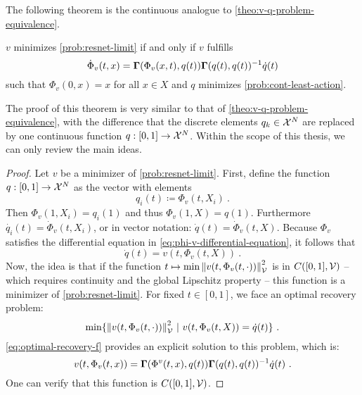 The following theorem is the continuous analogue to \cref{theo:v-q-problem-equivalence}.
\begin{theorem}
	\label{theo:v-q-continuous-problem-equivalence}
	$v$ minimizes \cref{prob:resnet-limit} if and only if $v$ fulfills
	\begin{equation}
			\dot{\Phi}_v(t, x) = \mathbf{\Gamma}(\Phi_v(x, t), q(t)) \mathbf{\Gamma}(q(t), q(t))^{-1} \dot{q}(t)
	\end{equation}
	such that $\Phi_v(0, x) = x$ for all $x \in X$ and $q$ minimizes \cref{prob:cont-least-action}.
\end{theorem}
The proof of this theorem is very similar to that of \cref{theo:v-q-problem-equivalence}, with the difference that the discrete elements $q_k \in \mathcal{X}^N$ are replaced by one continuous function $q: [0, 1] \rightarrow \mathcal{X}^N$.
Within the scope of this thesis, we can only review the main ideas.
\begin{proof}
	Let $v$ be a minimizer of \cref{prob:resnet-limit}.
	First, define the function $q: [0, 1] \rightarrow \mathcal{X}^N$ as the vector with elements
	\begin{equation}
		q_i(t) \coloneqq \Phi_v(t, X_i) \ .
	\end{equation}
	Then $\Phi_v(1, X_i) = q_i(1)$ and thus $\Phi_v(1, X) = q(1)$.
	Furthermore $\dot{q_i}(t) = \dot{\Phi}_v(t, X_i)$, or in vector notation: $\dot{q}(t) = \dot{\Phi}_v(t, X)$.
	Because $\Phi_v$ satisfies the differential equation in \cref{eq:phi-v-differential-equation}, it follows that
	\begin{equation}
		\dot{q}(t) = v(t, \Phi_v(t, X)) \ .
	\end{equation}
	Now, the idea is that if the function $t \mapsto \min \norm{v(t, \Phi_v(t, \cdot))}_{\mathcal{V}}^2$ is in $C([0, 1], \mathcal{V})$ -- which requires continuity and the global Lipschitz property -- this function is a minimizer of \cref{prob:resnet-limit}.
	For fixed $t \in [0, 1]$, we face an optimal recovery problem:
	\begin{equation}
		\min\{\norm{v(t, \Phi_v(t, \cdot))}_\cV^2\ |\ v(t, \Phi_v(t, X)) = \dot{q}(t)\} \ .
	\end{equation}
	\cref{eq:optimal-recovery-f} provides an explicit solution to this problem, which is:
	\begin{equation}
		v(t, \Phi_v(t, x)) = \mathbf{\Gamma}(\Phi^v(t, x), q(t))\mathbf{\Gamma}(q(t), q(t))^{-1}\dot{q}(t) \ .
	\end{equation}
	One can verify that this function is $C([0, 1], \mathcal{V})$.
\end{proof}


